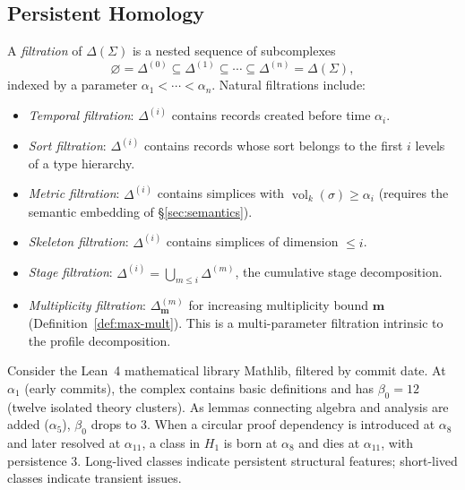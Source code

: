 
\subsection{Persistent Homology}

\begin{definition}[Filtration]
\label{def:filtration}
A \emph{filtration} of $\Delta(\Sigma)$ is a nested sequence of subcomplexes
\[
\varnothing = \Delta^{(0)} \subseteq \Delta^{(1)} \subseteq \cdots \subseteq \Delta^{(n)} = \Delta(\Sigma),
\]
indexed by a parameter $\alpha_1 < \cdots < \alpha_n$. Natural filtrations include:
\begin{itemize}
\item \emph{Temporal filtration}: $\Delta^{(i)}$ contains records created before time $\alpha_i$.
\item \emph{Sort filtration}: $\Delta^{(i)}$ contains records whose sort belongs to the first $i$ levels of a type hierarchy.
\item \emph{Metric filtration}: $\Delta^{(i)}$ contains simplices with $\operatorname{vol}_k(\sigma) \geq \alpha_i$ (requires the semantic embedding of \S\ref{sec:semantics}).
\item \emph{Skeleton filtration}: $\Delta^{(i)}$ contains simplices of dimension $\leq i$.
\item \emph{Stage filtration}: $\Delta^{(i)} = \bigcup_{m \leq i} \Delta^{(m)}$, the cumulative stage decomposition.
\item \emph{Multiplicity filtration}: $\Delta^{(m)}_{\mathbf{m}}$ for increasing multiplicity bound $\mathbf{m}$ (Definition~\ref{def:max-mult}). This is a multi-parameter filtration intrinsic to the profile decomposition.
\end{itemize}
\end{definition}

\begin{example}
Consider the Lean~4 mathematical library Mathlib, filtered by commit date. At $\alpha_1$ (early commits), the complex contains basic definitions and has $\beta_0 = 12$ (twelve isolated theory clusters). As lemmas connecting algebra and analysis are added ($\alpha_5$), $\beta_0$ drops to $3$. When a circular proof dependency is introduced at $\alpha_8$ and later resolved at $\alpha_{11}$, a class in $H_1$ is born at $\alpha_8$ and dies at $\alpha_{11}$, with persistence $3$. Long-lived classes indicate persistent structural features; short-lived classes indicate transient issues.
\end{example}

